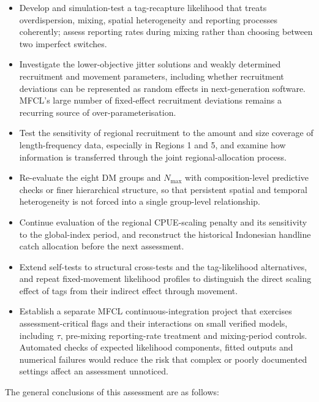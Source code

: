 \documentclass[
  english,
  a4paper,
  a4paper,
  11pt]{SCreport}
\begin{document}
\begin{itemize}
\item
  Develop and simulation-test a tag-recapture likelihood that treats
  overdispersion, mixing, spatial heterogeneity and reporting processes
  coherently; assess reporting rates during mixing rather than choosing
  between two imperfect switches.
\item
  Investigate the lower-objective jitter solutions and weakly determined
  recruitment and movement parameters, including whether recruitment
  deviations can be represented as random effects in next-generation
  software. MFCL's large number of fixed-effect recruitment deviations
  remains a recurring source of over-parameterisation.
\item
  Test the sensitivity of regional recruitment to the amount and size
  coverage of length-frequency data, especially in Regions 1 and 5, and
  examine how information is transferred through the joint
  regional-allocation process.
\item
  Re-evaluate the eight DM groups and \(N_{\max}\) with
  composition-level predictive checks or finer hierarchical structure,
  so that persistent spatial and temporal heterogeneity is not forced
  into a single group-level relationship.
\item
  Continue evaluation of the regional CPUE-scaling penalty and its
  sensitivity to the global-index period, and reconstruct the historical
  Indonesian handline catch allocation before the next assessment.
\item
  Extend self-tests to structural cross-tests and the tag-likelihood
  alternatives, and repeat fixed-movement likelihood profiles to
  distinguish the direct scaling effect of tags from their indirect
  effect through movement.
\item
  Establish a separate MFCL continuous-integration project that
  exercises assessment-critical flags and their interactions on small
  verified models, including \(\tau\), pre-mixing reporting-rate
  treatment and mixing-period controls. Automated checks of expected
  likelihood components, fitted outputs and numerical failures would
  reduce the risk that complex or poorly documented settings affect an
  assessment unnoticed.
\end{itemize}

The general conclusions of this assessment are as follows:
\end{document}
